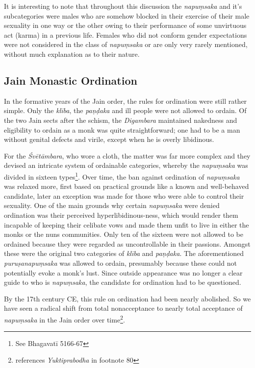 It is interesting to note that throughout this discussion the {\em napuṃsaka} and it's subcategories were males who are somehow blocked in their exercise of their male sexuality in one way or the other owing to their performance of some unvirtuous act (karma) in a previous life. Females who did not conform gender expectations were not considered in the class of {\em napuṃsaka} or are only very rarely mentioned, without much explanation as to their nature. 

\subsection{Jain Monastic Ordination}
In the formative years of the Jain order, the rules for ordination were still rather simple. Only the {\em klība}, the {\em paṇḍaka} and ill people were not allowed to ordain. Of the two Jain sects after the schism, the {\em Digambara} maintained nakedness and eligibility to ordain as a monk was quite straightforward; one had to be a man without genital defects and virile, except when he is overly libidinous. 

For the {\em Śvētāmbara}, who wore a cloth, the matter was far more complex and they devised an intricate system of ordainable categories, whereby the {\em napuṃsaka} was divided in sixteen types\footnote{See Bhagavatī 5166-67}. Over time, the ban against ordination of {\em napuṃsaka} was relaxed more, first based on practical grounds like a known and well-behaved candidate, later an exception was made for those who were able to control their sexuality. One of the main grounds why certain {\em napuṃsaka} were denied ordination was their perceived hyperlibidinous-ness, which would render them incapable of keeping their celibate vows and made them unfit to live in either the monks or the nuns communities. Only ten of the sixteen were not allowed to be ordained because they were regarded as uncontrollable in their passions. Amongst these were the original two categories of {\em klība} and {\em paṇḍaka}. The aforementioned {\em puruṣanapuṃsaka} was allowed to ordain, presumably because these could not potentially evoke a monk's lust. Since outside appearance was no longer a clear guide to who is {\em napuṃsaka}, the candidate for ordination had to be questioned. 

By the 17th century CE, this rule on ordination had been nearly abolished. So we have seen a radical shift from total nonacceptance to nearly total acceptance of {\em napuṃsaka} in the Jain order over time\footnote{\cite{zwilling} references {\em Yuktiprabodha} in footnote 80}.



